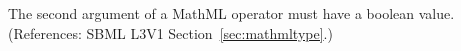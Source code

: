 The second argument of a MathML  operator must have
a boolean value.  (References: SBML L3V1 Section~\ref{sec:mathmltype}.)
